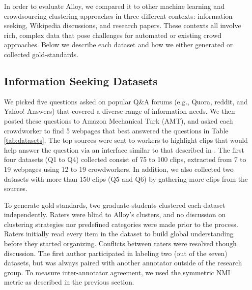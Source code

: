 


In order to evaluate Alloy, we compared it to other machine
learning and crowdsourcing clustering approaches in three different contexts:
information seeking, Wikipedia discussions, and research papers.
These contexts all involve rich, complex data that pose challenges for
automated or existing crowd approaches. Below we describe each dataset and how
we either generated or collected gold-standards.


\subsection{Information Seeking Datasets}
\label{chap:info_seek_datasets}

We picked five questions asked on popular Q\&A forums (e.g.,
Quora, reddit, and Yahoo! Answers) that covered a diverse
range of information needs. We then posted these questions to Amazon Mechanical
Turk (AMT), and asked each crowdworker to find 5 webpages that best answered
the questions in Table \ref{tab:datasets}. The top sources were sent to workers to highlight clips
that would help answer the question via an interface similar to that
described in \cite{kittur2013costs}.  The first four datasets (Q1 to Q4) collected consist of 75 to
100 clips, extracted from 7 to 19 webpages using 12 to 19 crowdworkers.
In addition, we also collected two datasets with more than 150 clips
(Q5 and Q6) by gathering more clips from the sources.

To generate gold standards, two graduate students clustered each dataset
independently.
Raters were blind to Alloy's clusters, and no discussion on
clustering strategies nor predefined categories were made prior to the
process. 
Raters initially read every item in the dataset to build global
understanding before they started organizing. Conflicts between raters were resolved though discussion. 
The first author participated in labeling two (out of the seven)
datasets, but was always paired with another annotator outside of the research group. 
To measure inter-annotator agreement, we used the symmetric NMI
metric as described in the previous section.


